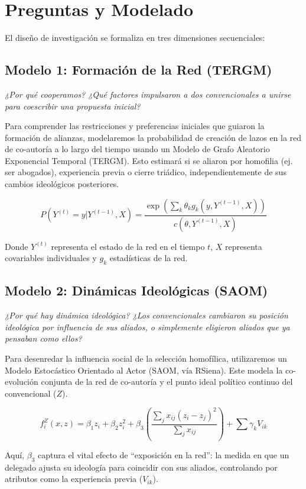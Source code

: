 \documentclass[11pt,a4paper]{article}
\begin{document}
\section{Preguntas y Modelado}

El diseño de investigación se formaliza en tres dimensiones secuenciales:

\subsection{Modelo 1: Formación de la Red (TERGM)}
\textit{¿Por qué cooperamos? ¿Qué factores impulsaron a dos convencionales a unirse para coescribir una propuesta inicial?}

Para comprender las restricciones y preferencias iniciales que guiaron la formación de alianzas, modelaremos la probabilidad de creación de lazos en la red de co-autoría a lo largo del tiempo usando un Modelo de Grafo Aleatorio Exponencial Temporal (TERGM). Esto estimará si se aliaron por homofilia (ej. ser abogados), experiencia previa o cierre triádico, independientemente de sus cambios ideológicos posteriores.

$$ P(Y^{(t)} = y | Y^{(t-1)}, X) = \frac{\exp\left( \sum_k \theta_k g_k(y, Y^{(t-1)}, X) \right)}{c(\theta, Y^{(t-1)}, X)} $$

Donde $Y^{(t)}$ representa el estado de la red en el tiempo $t$, $X$ representa covariables individuales y $g_k$ estadísticas de la red.

\subsection{Modelo 2: Dinámicas Ideológicas (SAOM)}
\textit{¿Por qué hay dinámica ideológica? ¿Los convencionales cambiaron su posición ideológica por influencia de sus aliados, o simplemente eligieron aliados que ya pensaban como ellos?}

Para desenredar la influencia social de la selección homofílica, utilizaremos un Modelo Estocástico Orientado al Actor (SAOM, vía RSiena). Este modela la co-evolución conjunta de la red de co-autoría y el punto ideal político continuo del convencional ($Z$). 

$$ f^Z_i(x, z) = \beta_1 z_i + \beta_2 z_i^2 + \beta_3 \left( \frac{\sum_j x_{ij} (z_i - z_j)^2}{\sum_j x_{ij}} \right) + \sum \gamma_k V_{ik} $$

Aquí, $\beta_3$ captura el vital efecto de ``exposición en la red'': la medida en que un delegado ajusta su ideología para coincidir con sus aliados, controlando por atributos como la experiencia previa ($V_{ik}$).
\end{document}
